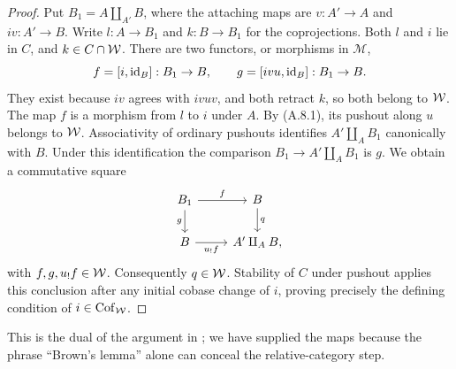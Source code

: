 \begin{proof}
Put $B_1=A\amalg_{A'}B$, where the attaching maps are $v:A'\to A$ and $iv:A'\to B$. Write $l:A\to B_1$ and $k:B\to B_1$ for the coprojections. Both $l$ and $i$ lie in $C$, and $k\in C\cap\mathcal{W}$. There are two functors, or morphisms in $\mathcal M$,
\[
f=[i,\mathrm{id}_B]:B_1\to B,\qquad
g=[ivu,\mathrm{id}_B]:B_1\to B.
\]
They exist because $iv$ agrees with $ivu v$, and both retract $k$, so both belong to $\mathcal{W}$. The map $f$ is a morphism from $l$ to $i$ under $A$. By (A.8.1), its pushout along $u$ belongs to $\mathcal{W}$. Associativity of ordinary pushouts identifies $A'\amalg_A B_1$ canonically with $B$. Under this identification the comparison $B_1\to A'\amalg_A B_1$ is $g$. We obtain a commutative square
\[
\begin{tikzcd}
B_1\ar[r,"f"]\ar[d,"g"']&B\ar[d,"q"]\\
B\ar[r,"u_!f"']&A'\amalg_A B,
\end{tikzcd}
\]
with $f,g,u_!f\in\mathcal{W}$. Consequently $q\in\mathcal{W}$. Stability of $C$ under pushout applies this conclusion after any initial cobase change of $i$, proving precisely the defining condition of $i\in\operatorname{Cof}_{\mathcal{W}}$.
\end{proof}



This is the dual of the argument in \citet[\S4, Lemmas~1--2, pp.~428--429]{AGBrown1973}; we have supplied the maps because the phrase ``Brown's lemma'' alone can conceal the relative-category step.

